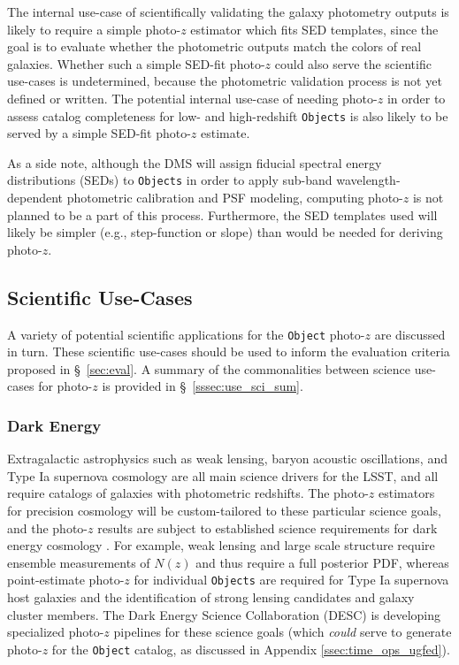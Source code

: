\documentclass[DM,authoryear,toc]{lsstdoc}
\begin{document}
\begin{enumerate}
The internal use-case of scientifically validating the galaxy photometry outputs is likely to require a simple photo-$z$ estimator which fits SED templates, since the goal is to evaluate whether the photometric outputs match the colors of real galaxies.
Whether such a simple SED-fit photo-$z$ could also serve the scientific use-cases is undetermined, because the photometric validation process is not yet defined or written.
The potential internal use-case of needing photo-$z$ in order to assess catalog completeness for low- and high-redshift {\tt Objects} is also likely to be served by a simple SED-fit photo-$z$ estimate.

As a side note, although the DMS will assign fiducial spectral energy distributions (SEDs) to {\tt Objects} in order to apply sub-band wavelength-dependent photometric calibration and PSF modeling, computing photo-$z$ is not planned to be a part of this process.
Furthermore, the SED templates used will likely be simpler (e.g., step-function or slope) than would be needed for deriving photo-$z$.

\subsection{Scientific Use-Cases}\label{ssec:use_sci}

A variety of potential scientific applications for the {\tt Object} photo-$z$ are discussed in turn. 
These scientific use-cases should be used to inform the evaluation criteria proposed in \S~\ref{sec:eval}.
A summary of the commonalities between science use-cases for photo-$z$ is provided in \S~\ref{sssec:use_sci_sum}.

\subsubsection{Dark Energy}\label{sssec:use_sci_de}
Extragalactic astrophysics such as weak lensing, baryon acoustic oscillations, and Type Ia supernova cosmology are all main science drivers for the LSST, and all require catalogs of galaxies with photometric redshifts.
The photo-$z$ estimators for precision cosmology will be custom-tailored to these particular science goals, and the photo-$z$ results are subject to established science requirements for dark energy cosmology \citep{2018arXiv180901669T}.
For example, weak lensing and large scale structure require ensemble measurements of $N(z)$ and thus require a full posterior PDF, whereas point-estimate photo-$z$ for individual {\tt Objects} are required for Type Ia supernova host galaxies and the identification of strong lensing candidates and galaxy cluster members. 
The Dark Energy Science Collaboration (DESC) is developing specialized photo-$z$ pipelines for these science goals (which {\it could} serve to generate photo-$z$ for the {\tt Object} catalog, as discussed in Appendix \ref{ssec:time_ops_ugfed}).


\end{enumerate}
\end{document}
